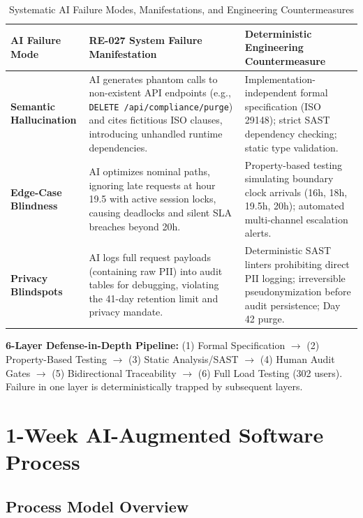 \documentclass[10pt,a4paper]{article}
\begin{document}
\begin{table}[htbp]
\centering
\scriptsize
\begin{tabularx}{\textwidth}{|l|X|X|}
\hline
\textbf{AI Failure Mode} & \textbf{RE-027 System Failure Manifestation} & \textbf{Deterministic Engineering Countermeasure} \\
\hline
\textbf{Semantic Hallucination} & AI generates phantom calls to non-existent API endpoints (e.g., \texttt{DELETE /api/compliance/purge}) and cites fictitious ISO clauses, introducing unhandled runtime dependencies. & Implementation-independent formal specification (ISO 29148); strict SAST dependency checking; static type validation. \\
\hline
\textbf{Edge-Case Blindness} & AI optimizes nominal paths, ignoring late requests at hour 19.5 with active session locks, causing deadlocks and silent SLA breaches beyond 20h. & Property-based testing simulating boundary clock arrivals (16h, 18h, 19.5h, 20h); automated multi-channel escalation alerts. \\
\hline
\textbf{Privacy Blindspots} & AI logs full request payloads (containing raw PII) into audit tables for debugging, violating the 41-day retention limit and privacy mandate. & Deterministic SAST linters prohibiting direct PII logging; irreversible pseudonymization before audit persistence; Day 42 purge. \\
\hline
\end{tabularx}
\caption{Systematic AI Failure Modes, Manifestations, and Engineering Countermeasures}
\label{tab:failure_modes}
\end{table}

\textbf{6-Layer Defense-in-Depth Pipeline:} (1) Formal Specification $\rightarrow$ (2) Property-Based Testing $\rightarrow$ (3) Static Analysis/SAST $\rightarrow$ (4) Human Audit Gates $\rightarrow$ (5) Bidirectional Traceability $\rightarrow$ (6) Full Load Testing (302 users). Failure in one layer is deterministically trapped by subsequent layers.

\section{1-Week AI-Augmented Software Process}

\subsection{Process Model Overview}
\end{document}
